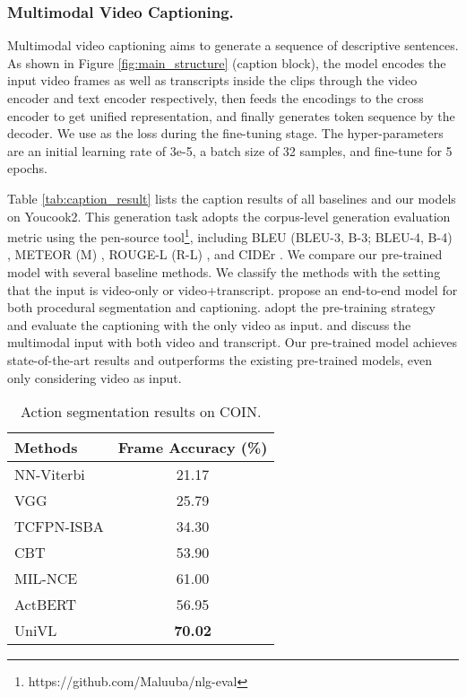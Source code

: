 \documentclass[11pt,a4paper]{article}
\begin{document}
	\subsubsection{Multimodal Video Captioning.}
	Multimodal video captioning aims to generate a sequence of descriptive sentences. As shown in Figure \ref{fig:main_structure} (caption block), the model encodes the input video frames as well as transcripts inside the clips through the video encoder and text encoder respectively, then feeds the encodings to the cross encoder to get unified representation, and finally generates token sequence by the decoder. We use  as the loss during the fine-tuning stage. The hyper-parameters are an initial learning rate of 3e-5, a batch size of 32 samples, and fine-tune for 5 epochs.
	
	Table \ref{tab:caption_result} lists the caption results of all baselines and our models on Youcook2. This generation task adopts the corpus-level generation evaluation metric using the pen-source tool\footnote{https://github.com/Maluuba/nlg-eval}, including BLEU (BLEU-3, B-3; BLEU-4, B-4) \cite{papineni2002bleu}, METEOR (M) \cite{banerjee2005meteor}, ROUGE-L (R-L) \cite{lin2004automatic}, and CIDEr \cite{vedantam2015cider}. We compare our pre-trained model with several baseline methods. We classify the methods with the setting that the input is video-only or video+transcript. \citet{zhou2018towards} propose an end-to-end model for both procedural segmentation and captioning.  \citet{sun2019videobert,sun2019contrastive,Zhu_2020_CVPR,Korbar2020} adopt the pre-training strategy and evaluate the captioning with the only video as input. \citet{shi2019dense} and \citet{hessel2019case} discuss the multimodal input with both video and transcript. Our pre-trained model achieves state-of-the-art results and outperforms the existing pre-trained models, even only considering video as input.
	\begin{table*}[tp] 
		\setlength{\tabcolsep}{2pt}
		\centering
\begin{tabular}{lc}
			\toprule
			Methods         & Frame Accuracy (\%) \\ \midrule
			NN-Viterbi \cite{Richard2018NeuralNetwork}   & 21.17  \\  
			VGG \cite{Simonyan2014Very}  & 25.79  \\  
			TCFPN-ISBA \cite{Ding2018Weakly}   & 34.30  \\  
			CBT  \cite{sun2019contrastive}   & 53.90  \\  
			MIL-NCE \cite{miech19endtoend}   & 61.00  \\  
			ActBERT \cite{Zhu_2020_CVPR}   & 56.95  \\  
			\midrule
			UniVL   & \textbf{70.02} \\
			\bottomrule
		\end{tabular}
\caption{Action segmentation results on COIN.}
		\label{tab:result_of_segmentation_COIN}
	\end{table*}
\end{document}
